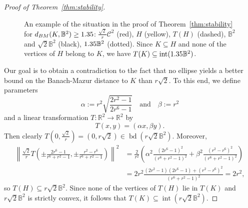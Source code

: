 \documentclass[12pt,a4paper]{article}
\theoremstyle{definition}
\DeclareMathOperator{\bd}{bd}
\DeclareMathOperator{\inte}{int}
\newcommand\R{\mathbb{R}}
\newcommand\B{\mathbb{B}}
\newcommand\CC{\mathcal{C}}
\def\ds{1.5/\scale pt}
\begin{document}
\begin{proof}[Proof of Theorem~\ref{thm:stability}]
\begin{figure}[ht]
%
\caption{
An example of the situation in the proof of Theorem~\ref{thm:stability} for $d_{BM}(K,\B^2) \geq \d$: $\frac{\sqrt{2}}{r} \CC^2$ (red), $H$ (yellow), $T(H)$ (dashed), $\B^2$ and $\sqrt{2} \B^2$ (black), $\d \B^2$ (dotted). Since $K \subseteq H$ and none of the vertices of $H$ belong to $K$, we have $T(K) \subseteq \inte(\d \B^2)$.
}
%
\label{fig:stab_T(H)}
\end{figure}



Our goal is to obtain a contradiction to the fact that no ellipse yields a better bound on the Banach-Mazur distance to $K$ than $r \sqrt{2}$. To this end, we define parameters
$$ \alpha := r^2 \sqrt{\frac{2 r^2 - 1}{2 r^6 - 1}}
\quad \text{and} \quad
\beta := r^2 $$
and a linear transformation $T \colon \R^2 \to \R^2$ by
$$ T(x,y) = (\alpha x, \beta y). $$
Then clearly $T \left( 0,\frac{\sqrt{2}}{r} \right) = \left( 0,r \sqrt{2} \right) \in \bd(r \sqrt{2} \B^2)$. Moreover,
\begin{align*}
\left\| \frac{\sqrt{2}}{r} T \left( \pm \frac{2 r^6 - 1}{r^6 + r^2 - 1}, \pm \frac{r^2 - r^6}{r^6 + r^2 - 1} \right) \right\|^2
& = \frac{2}{r^2} \left( \alpha^2 \frac{(2 r^6 - 1)^2}{(r^6 + r^2 - 1)^2} + \beta^2 \frac{(r^2 - r^6)^2}{(r^6 + r^2 - 1)^2} \right) \\
& = 2 r^2 \frac{(2 r^2 - 1) (2 r^6 - 1) + (r^2 - r^6)^2}{(r^6 + r^2 - 1)^2}
= 2 r^2,
\end{align*}
so $T(H) \subseteq r \sqrt{2} \B^2$. Since none of the vertices of $T(H)$ lie in $T(K)$ and $r \sqrt{2} \B^2$ is strictly convex, it follows that $T(K) \subseteq \inte(r \sqrt{2} \B^2)$.


\end{proof}
\end{document}
